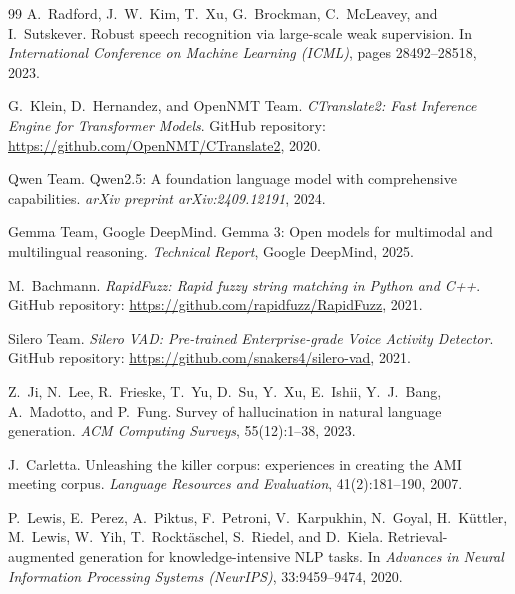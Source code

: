 \documentclass[10pt,a4paper]{article}
\begin{document}
\begin{thebibliography}{99}
A.~Radford, J.~W.~Kim, T.~Xu, G.~Brockman, C.~McLeavey, and I.~Sutskever.
\newblock Robust speech recognition via large-scale weak supervision.
\newblock In \emph{International Conference on Machine Learning (ICML)}, pages 28492--28518, 2023.

G.~Klein, D.~Hernandez, and OpenNMT Team.
\newblock \emph{CTranslate2: Fast Inference Engine for Transformer Models}.
\newblock GitHub repository: \url{https://github.com/OpenNMT/CTranslate2}, 2020.

Qwen Team.
\newblock Qwen2.5: A foundation language model with comprehensive capabilities.
\newblock \emph{arXiv preprint arXiv:2409.12191}, 2024.

Gemma Team, Google DeepMind.
\newblock Gemma 3: Open models for multimodal and multilingual reasoning.
\newblock \emph{Technical Report}, Google DeepMind, 2025.

M.~Bachmann.
\newblock \emph{RapidFuzz: Rapid fuzzy string matching in Python and C++}.
\newblock GitHub repository: \url{https://github.com/rapidfuzz/RapidFuzz}, 2021.

Silero Team.
\newblock \emph{Silero VAD: Pre-trained Enterprise-grade Voice Activity Detector}.
\newblock GitHub repository: \url{https://github.com/snakers4/silero-vad}, 2021.

Z.~Ji, N.~Lee, R.~Frieske, T.~Yu, D.~Su, Y.~Xu, E.~Ishii, Y.~J.~Bang, A.~Madotto, and P.~Fung.
\newblock Survey of hallucination in natural language generation.
\newblock \emph{ACM Computing Surveys}, 55(12):1--38, 2023.

J.~Carletta.
\newblock Unleashing the killer corpus: experiences in creating the {AMI} meeting corpus.
\newblock \emph{Language Resources and Evaluation}, 41(2):181--190, 2007.

P.~Lewis, E.~Perez, A.~Piktus, F.~Petroni, V.~Karpukhin, N.~Goyal, H.~K\"{u}ttler, M.~Lewis, W.~Yih, T.~Rockt\"{a}schel, S.~Riedel, and D.~Kiela.
\newblock Retrieval-augmented generation for knowledge-intensive {NLP} tasks.
\newblock In \emph{Advances in Neural Information Processing Systems (NeurIPS)}, 33:9459--9474, 2020.
\end{thebibliography}
\end{document}
